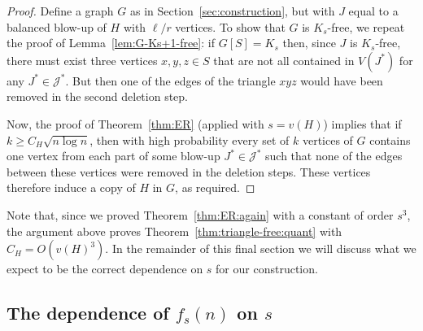 \documentclass[10pt,a4paper]{amsart}
\numberwithin{theorem}{section}
\renewcommand{\(}{\bigl(}
\renewcommand{\)}{\bigr)\vphantom{)}}
\newcommand{\cJ}{\mathcal J}
\renewcommand{\ge}{\geqslant}
\begin{document}
\begin{proof}
Define a graph $G$ as in Section~\ref{sec:construction}, but with $J$ equal to a balanced blow-up of $H$ with $\ell/r$ vertices. To show that $G$ is $K_s$-free, we repeat the proof of Lemma~\ref{lem:G-Ks+1-free}: if $G[S] = K_s$ then, since $J$ is $K_s$-free, there must exist three vertices $x,y,z \in S$ that are not all contained in $V(J^*)$ for any $J^* \in \cJ^*$. But then one of the edges of the triangle $xyz$ would have been removed in the second deletion step.

Now, the proof of Theorem~\ref{thm:ER} (applied with $s = v(H)$) implies that if $k \ge C_H \displaystyle{ \sqrt{n \log n} }$, then with high probability every set of $k$ vertices of $G$ contains one vertex from each part of some blow-up $J^* \in \cJ^*$ such that none of the edges between these vertices were removed in the deletion steps. These vertices therefore induce a copy of $H$ in $G$, as required. 
\end{proof}

Note that, since we proved Theorem~\ref{thm:ER:again} with a constant of order $s^3$, the argument above proves Theorem~\ref{thm:triangle-free:quant} with $C_H = O(v(H)^3)$. In the remainder of this final section we will discuss what we expect to be the correct dependence on $s$ for our construction.  

\subsection{The dependence of $f_s(n)$ on $s$}\label{discussion:sec}
\end{document}
